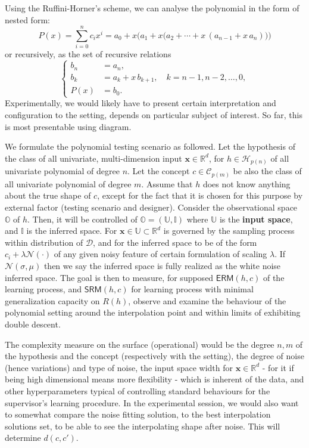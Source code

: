 \documentclass[10pt,oneside,oldfontcommands,dvipsnames,article]{memoir}
\begin{document}
Using the Ruffini-Horner's scheme, we can analyse the polynomial in the form of nested form: 
\begin{equation}
P(x) = \sum^{n}_{i=0}c_{i}x^{i} = a_0 + x\bigl(a_1 + x\bigl(a_2 + \cdots + x\,(a_{n-1} + x\,a_n)\bigr)\bigr)
\end{equation}
or recursively, as the set of recursive relations
\begin{equation}
  \begin{cases}
b_n               &= a_n,\\
b_k               &= a_k + x\,b_{k+1}, \quad k = n-1, n-2, \dots, 0,\\
P(x)              &= b_0.
\end{cases}
\end{equation}
Experimentally, we would likely have to present certain interpretation and configuration to the setting, depends on particular subject of interest. So far, this is most presentable using diagram.

\begin{setting}
    We formulate the polynomial testing scenario as followed. Let the hypothesis of the class of all univariate, multi-dimension input $\mathbf{x}\in\mathbb{R}^{d}$, for $h\in \mathcal{H}_{p(n)}$ of all univariate polynomial of degree $n$. Let the concept $c\in \mathcal{C}_{p(m)}$ be also the class of all univariate polynomial of degree $m$. Assume that $h$ does not know anything about the true shape of $c$, except for the fact that it is chosen for this purpose by external factor (testing scenario and designer). Consider the observational space $\mathbb{O}$ of $h$. Then, it will be controlled of $\mathbb{O}=(\mathbb{U},\mathbb{I})$ where $\mathbb{U}$ is the \textbf{input space}, and $\mathbb{I}$ is the inferred space. For $\mathbf{x}\in \mathbb{U}\subset \mathbb{R}^{d}$ is governed by the sampling process within distribution of $\mathcal{D}$, and for the inferred space to be of the form $c_{i}+\lambda\mathcal{N}(\cdot)$ of any given noisy feature of certain formulation of scaling $\lambda$. If $\mathcal{N}(\sigma, \mu)$ then we say the inferred space is fully realized as the white noise inferred space. The goal is then to measure, for supposed $\mathsf{ERM}(h,c)$ of the learning process, and $\mathsf{SRM}(h,c)$ for learning process with minimal generalization capacity on $R(h)$, observe and examine the behaviour of the polynomial setting around the interpolation point and within limits of exhibiting double descent. 
\end{setting}
The complexity measure on the surface (operational) would be the degree $n,m$ of the hypothesis and the concept (respectively with the setting), the degree of noise (hence variations) and type of noise, the input space width for $\mathbf{x}\in \mathbb{R}^{d}$ - for it if being high dimensional means more flexibility - which is inherent of the data, and other hyperparameters typical of controlling standard behaviours for the supervisor's learning procedure. In the experimental session, we would also want to somewhat compare the noise fitting solution, to the best interpolation solutions set, to be able to see the interpolating shape after noise. This will determine $d(c,c')$.
\end{document}
